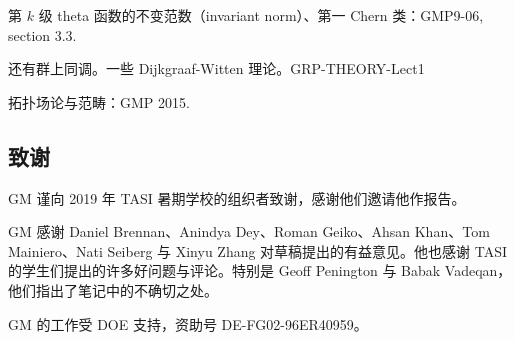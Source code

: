 第 $k$ 级 theta 函数的不变范数（invariant norm）、第一 Chern 类：GMP9-06, section 3.3.

还有群上同调。一些 Dijkgraaf-Witten 理论。GRP-THEORY-Lect1

拓扑场论与范畴：GMP 2015.


\subsection*{致谢} %

GM 谨向 2019 年 TASI 暑期学校的组织者致谢，感谢他们邀请他作报告。

GM 感谢 Daniel Brennan、Anindya Dey、Roman Geiko、Ahsan Khan、Tom Mainiero、Nati Seiberg 与 Xinyu Zhang 对草稿提出的有益意见。他也感谢 TASI 的学生们提出的许多好问题与评论。特别是 Geoff Penington 与 Babak Vadeqan，他们指出了笔记中的不确切之处。

GM 的工作受 DOE 支持，资助号 DE-FG02-96ER40959。

